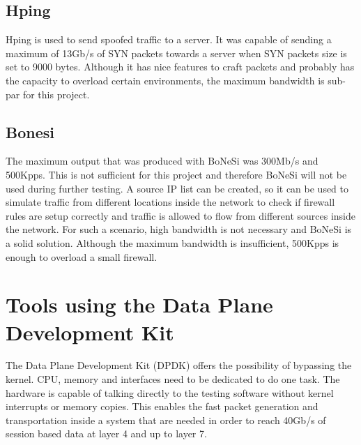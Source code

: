 \subsection{Hping}
Hping is used to send spoofed traffic to a server. It was capable of sending a maximum of 13Gb/s of SYN packets towards a server when SYN packets size is set to 9000 bytes. Although it has nice features to craft packets and probably has the capacity to overload certain environments, the maximum bandwidth is sub-par for this project.  

\subsection{Bonesi}
The maximum output that was produced with BoNeSi was 300Mb/s and 500Kpps. This is not sufficient for this project and therefore BoNeSi will not be used during further testing. A source IP list can be created, so it can be used to simulate traffic from different locations inside the network to check if firewall rules are setup correctly and traffic is allowed to flow from different sources inside the network. For such a scenario, high bandwidth is not necessary and BoNeSi is a solid solution. Although the maximum bandwidth is insufficient, 500Kpps is enough to overload a small firewall.  

\section{Tools using the Data Plane Development Kit}
The Data Plane Development Kit (DPDK) offers the possibility of bypassing the kernel. CPU, memory and interfaces need to be dedicated to do one task. The hardware is capable of talking directly to the testing software without kernel interrupts or memory copies. This enables the fast packet generation and transportation inside a system that are needed in order to reach 40Gb/s of session based data at layer 4 and up to layer 7. 

